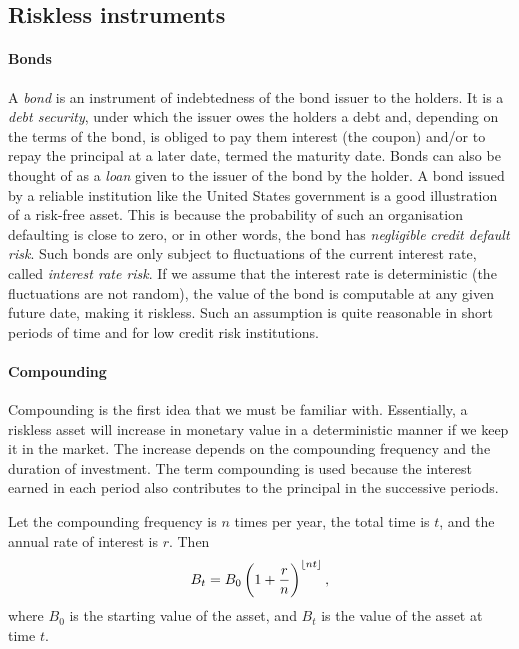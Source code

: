 \subsection{Riskless instruments}
\label{subsec:intro-assets-riskless}


\paragraph{Bonds}
A \emph{bond} is an instrument of indebtedness of the bond issuer to the holders. It is a \emph{debt security}, under which the issuer owes the holders a debt and, depending on the terms of the bond, is obliged to pay them interest (the coupon) and/or to repay the principal at a later date, termed the maturity date. Bonds can also be thought of as a \emph{loan} given to the issuer of the bond by the holder. A bond issued by a reliable institution like the United States government is a good illustration of a risk-free asset. This is because the probability of such an organisation defaulting is close to zero, or in other words, the bond has \emph{negligible} \emph{credit default risk}. Such bonds are only subject to fluctuations of the current interest rate, called \emph{interest rate risk}. If we assume that the interest rate is deterministic (the fluctuations are not random), the value of the bond is computable at any given future date, making it riskless. Such an assumption is quite reasonable in short periods of time and for low credit risk institutions.


\paragraph{Compounding}
Compounding is the first idea that we must be familiar with. Essentially, a riskless asset will increase in monetary value in a deterministic manner if we keep it in the market. The increase depends on the compounding frequency and the duration of investment. The term compounding is used because the interest earned in each period also contributes to the principal in the successive periods.

Let the compounding frequency is $ n $ times per year, the total time is $ t $, and the annual rate of interest is $ r $. Then
\begin{equation}
\label{eq:intro-compounding-discrete}
B_t = B_0 \left(1 + \frac{r}{n} \right)^{\left\lfloor nt\right\rfloor},
\end{equation}
where $ B_0 $ is the starting value of the asset, and $ B_t $ is the value of the asset at time $ t $.

